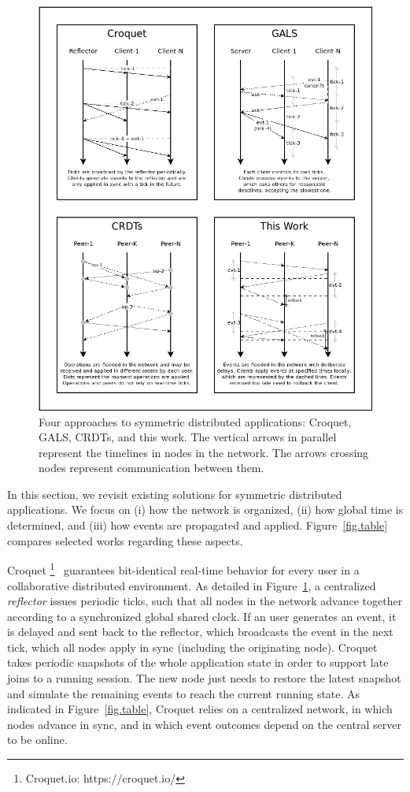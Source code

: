 \documentclass[10pt,journal,compsoc]{IEEEtran}
\begin{document}
\begin{figure}[t]
  \centering
  \includegraphics[width=\linewidth]{algos}
  \caption{
    \label{fig.algos}
    Four approaches to symmetric distributed applications: Croquet, GALS,
    CRDTs, and this work.
    The vertical arrows in parallel represent the timelines in nodes in the
    network.
    The arrows crossing nodes represent communication between them.
  }
\end{figure}

In this section, we revisit existing solutions for symmetric distributed
applications.
We focus on (i) how the network is organized, (ii) how global time is
determined, and (iii) how events are propagated and applied.
Figure~\ref{fig.table} compares selected works regarding these aspects.

Croquet%
\footnote{Croquet.io: https://croquet.io/}~\cite{croquet} guarantees
bit-identical real-time behavior for every user in a collaborative
distributed environment.
%
As detailed in Figure~\ref{fig.algos}, a centralized \emph{reflector} issues
periodic ticks, such that all nodes in the network advance together according
to a synchronized global shared clock.
If an user generates an event, it is delayed and sent back to the reflector,
which broadcasts the event in the next tick, which all nodes apply in sync
(including the originating node).
%
Croquet takes periodic snapshots of the whole application state in order to
support late joins to a running session.
The new node just needs to restore the latest snapshot and simulate the
remaining events to reach the current running state.
%
As indicated in Figure~\ref{fig.table}, Croquet relies on a centralized
network, in which nodes advance in sync, and in which event outcomes depend
on the central server to be online.
\end{document}
